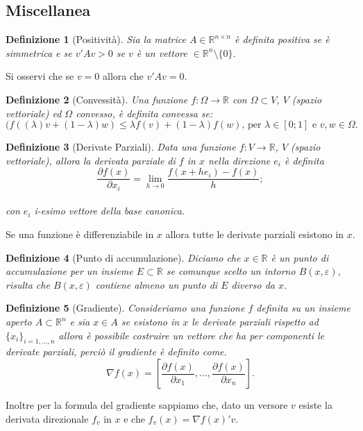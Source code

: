 \documentclass[a4paper, 12pt]{article}
\newtheorem{definition}{Definizione}
\begin{document}
\subsection{Miscellanea}
\begin{definition}[Positività]
Sia la matrice $A \in \mathbb{R}^{n \times n}$ è definita positiva se è simmetrica e se $v'Av > 0$ se $v$ è un vettore $\in \mathbb{R}^n \setminus \{0\}$.
\end{definition}
Si osservi che se $v = 0$ allora che $v'Av = 0$.
\begin{definition}[Convessità]
Una funzione $f:\Omega \to \mathbb{R}$ con $\Omega \subset V$, $V$ (spazio vettoriale) ed $\Omega$ convesso, è definita convessa se:\\ \[(f((\lambda)v + (1 - \lambda)w) \leq \lambda f(v) + (1 - \lambda)f(w) \mbox{, per } \lambda \in [0;1] \mbox{ e } v, w \in \Omega.\]
\end{definition}
\begin{definition}[Derivate Parziali]
Data una funzione $f:V \to \mathbb{R}$, $V$ (spazio vettoriale), allora la derivata parziale di $f$ in $x$ nella direzione $e_i$ è definita\\
\[\frac{\partial f(x)}{\partial x_i} = \lim_{h \to 0} \frac{f(x + h e_i) - f(x)}{h};\]\\ 
con $e_i$ i-esimo vettore della base canonica.\\
\end{definition}
Se una funzione è differenziabile in $x$ allora tutte le derivate parziali esistono in $x$.
\begin{definition}[Punto di accumulazione]
Diciamo che $x \in \mathbb{R}$ è un punto di accumulazione per un insieme $E \subset \mathbb{R}$ se comunque scelto un intorno $B(x, \varepsilon)$, risulta che $B(x, \varepsilon)$ contiene almeno un punto di $E$ diverso da $x$.
\end{definition}
\begin{definition}[Gradiente]
Consideriamo una funzione $f$ definita su un insieme aperto $A \subset \mathbb{R}^n$ e sia $x \in A$ se esistono in $x$ le derivate parziali rispetto ad $\{x_i\}_{i=1, ..., n}$ allora è possibile costruire un vettore che ha per componenti le derivate parziali, perciò il gradiente è definito come.\\
\[\nabla f(x) = \left[\frac{\partial f(x)}{\partial x_1}, ..., \frac{\partial f(x)}{\partial x_n}\right].\]
\end{definition}
Inoltre per la formula del gradiente sappiamo che, dato un versore $v$ esiste la derivata direzionale $f_v$ in $x$ e che $f_v(x) = \nabla f(x)' v$.
\newpage



\end{document}
